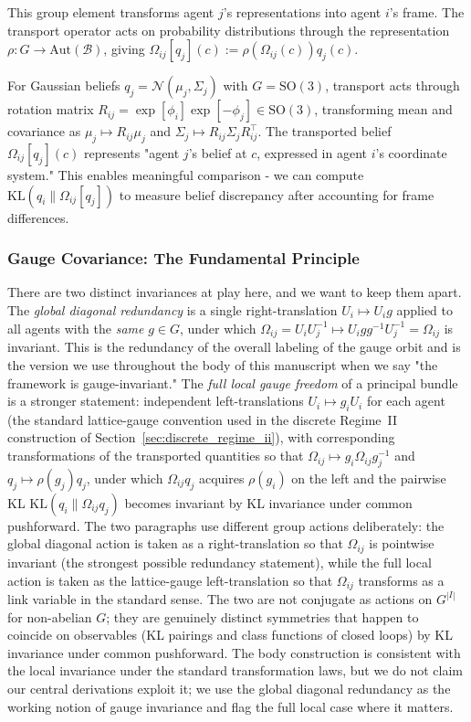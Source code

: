 \documentclass[11pt]{article}
\begin{document}
This group element transforms agent $j$'s representations into agent $i$'s frame. The transport operator acts on probability distributions through the representation $\rho: G \to \mathrm{Aut}(\mathcal{B})$, giving $\Omega_{ij}[q_j](c) := \rho(\Omega_{ij}(c))  q_j(c)$.

For Gaussian beliefs $q_j = \mathcal{N}(\mu_j, \Sigma_j)$ with $G = \mathrm{SO}(3)$, transport acts through rotation matrix $R_{ij} = \exp[\phi_i]\exp[ - \phi_j] \in \mathrm{SO}(3)$, transforming mean and covariance as $\mu_j \mapsto R_{ij} \mu_j$ and $\Sigma_j \mapsto R_{ij} \Sigma_j R_{ij}^\top$. The transported belief $\Omega_{ij}[q_j](c)$ represents "agent $j$'s belief at $c$, expressed in agent $i$'s coordinate system." This enables meaningful comparison - we can compute $\mathrm{KL}(q_i \| \Omega_{ij}[q_j])$ to measure belief discrepancy after accounting for frame differences.

\subsubsection{Gauge Covariance: The Fundamental Principle}
\label{sec:gauge_covariance_principle}

There are two distinct invariances at play here, and we want to keep them apart. The \emph{global diagonal redundancy} is a single right-translation $U_i \mapsto U_i g$ applied to all agents with the \emph{same} $g \in G$, under which $\Omega_{ij} = U_i U_j^{-1} \mapsto U_i g g^{-1} U_j^{-1} = \Omega_{ij}$ is invariant. This is the redundancy of the overall labeling of the gauge orbit and is the version we use throughout the body of this manuscript when we say "the framework is gauge-invariant." The \emph{full local gauge freedom} of a principal bundle is a stronger statement: independent left-translations $U_i \mapsto g_i U_i$ for each agent (the standard lattice-gauge convention used in the discrete Regime~II construction of Section~\ref{sec:discrete_regime_ii}), with corresponding transformations of the transported quantities so that $\Omega_{ij} \mapsto g_i \Omega_{ij} g_j^{-1}$ and $q_j \mapsto \rho(g_j) q_j$, under which $\Omega_{ij} q_j$ acquires $\rho(g_i)$ on the left and the pairwise KL $\mathrm{KL}(q_i \| \Omega_{ij} q_j)$ becomes invariant by KL invariance under common pushforward. The two paragraphs use different group actions deliberately: the global diagonal action is taken as a right-translation so that $\Omega_{ij}$ is pointwise invariant (the strongest possible redundancy statement), while the full local action is taken as the lattice-gauge left-translation so that $\Omega_{ij}$ transforms as a link variable in the standard sense. The two are not conjugate as actions on $G^{|I|}$ for non-abelian $G$; they are genuinely distinct symmetries that happen to coincide on observables (KL pairings and class functions of closed loops) by KL invariance under common pushforward. The body construction is consistent with the local invariance under the standard transformation laws, but we do not claim our central derivations exploit it; we use the global diagonal redundancy as the working notion of gauge invariance and flag the full local case where it matters.
\end{document}
